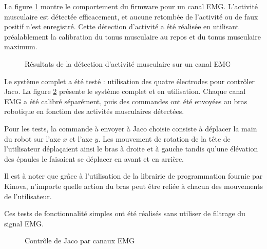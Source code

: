 \documentclass[letterpaper, twoside, 12pt, memoire, creativecommons, hyperref]{thETS}
\begin{document}
La figure \ref{fig:onset} montre le comportement du firmware pour un canal EMG. L'activité musculaire est détectée efficacement, et aucune retombée de l'activité ou de faux positif n'est enregistré. Cette détection d'activité a été réalisée en utilisant préalablement la calibration du tonus musculaire au repos et du tonus musculaire maximum. 

\begin{figure}
	\centering
	\caption{Résultats de la détection d'activité musculaire sur un canal EMG}
	\label{fig:onset}
\end{figure}

Le système complet a été testé : utilisation des quatre électrodes pour contrôler Jaco. La figure \ref{fig:montageglobal} présente le système complet et en utilisation. Chaque canal EMG a été calibré séparément, puis des commandes ont été envoyées au bras robotique en fonction des activités musculaires détectées. 

Pour les tests, la commande à envoyer à Jaco choisie consiste à déplacer la main du robot sur l'axe $x$ et l'axe $y$. Les mouvement de rotation de la tête de l'utilisateur déplaçaient ainsi le bras à droite et à gauche tandis qu'une élévation des épaules le faisaient se déplacer en avant et en arrière. 

Il est à noter que grâce à l'utilisation de la librairie de programmation fournie par Kinova, n'importe quelle action du bras peut être reliée à chacun des mouvements de l'utilisateur.

Ces tests de fonctionnalité simples ont été réalisés sans utiliser de filtrage du signal EMG.

\begin{figure}
	\centering
	\caption{Contrôle de Jaco par canaux EMG}
	\label{fig:montageglobal}
\end{figure}
\end{document}
